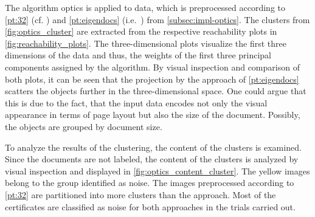 The algorithm \ac{optics} is applied to data, which is preprocessed according to \autoref{pt:32} (cf. \cite{OPTICS1999}) 
and \autoref{pt:eigendocs} (i.e.\ \eigendocs{}) from \autoref{subsec:impl-optics}.
The clusters from \autoref{fig:optics_cluster} are extracted from the respective reachability plots in \autoref{fig:reachability_plots}.
The three-dimensional plots visualize the first three dimensions of the data and thus, 
the weights of the first three principal components assigned by the \eigendocs{} algorithm.
By visual inspection and comparison of both plots, 
it can be seen that the projection by the \eigendocs{} approach of \autoref{pt:eigendocs} scatters the objects further in the three-dimensional space.
One could argue that this is due to the fact, 
that the input data encodes not only the visual appearance in terms of page layout but also the size of the document.
Possibly, the objects are grouped by document size.


To analyze the results of the clustering, the content of the clusters is examined.
Since the documents are not labeled, the content of the clusters is analyzed by visual inspection and displayed in \autoref{fig:optics_content_cluster}.
The yellow images belong to the group identified as noise.
The images preprocessed according to \autoref{pt:32} are partitioned into more clusters than the \eigendocs{} approach.
Most of the certificates are classified as noise for both approaches in the trials carried out.

